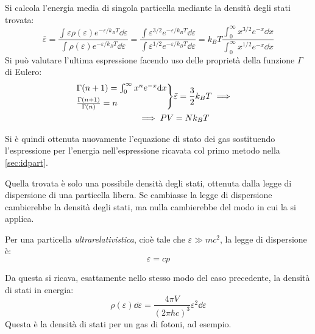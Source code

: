 \begin{es}
	Si calcola l'energia media di singola particella mediante la densità degli stati trovata:
	\begin{equation*}
	\bar{\varepsilon} = \frac{\int \varepsilon \rho(\varepsilon) e^{-\varepsilon/k_B T} \dd\varepsilon}{\int \rho(\varepsilon) e^{-\varepsilon/k_B T} \dd\varepsilon} = \frac{\int \varepsilon^{3/2} e^{-\varepsilon/k_B T} \dd\varepsilon}{\int \varepsilon^{1/2} e^{-\varepsilon/k_B T} \dd\varepsilon} = k_B T \frac{\int_0^\infty x^{3/2} e^{-x} \dd x}{\int_0^\infty x^{1/2} e^{-x} \dd x}
	\end{equation*}
	Si può valutare l'ultima espressione facendo uso delle proprietà della funzione $\Gamma$ di Eulero:
	\begin{align*}
	\begin{rcases*}
	\Gamma(n + 1) = \int_0^\infty x^n e^{-x} \dd x\\
	\frac{\Gamma(n + 1)}{\Gamma(n)} = n
	\end{rcases*}&
	\bar{\varepsilon} = \frac{3}{2} k_B T \implies\\
	\implies PV &= N k_B T
	\end{align*}
	
	Si è quindi ottenuta nuovamente l'equazione di stato dei gas sostituendo l'espressione per l'energia nell'espressione ricavata col primo metodo nella \cref{sec:idpart}.
\end{es}

Quella trovata è solo una possibile densità degli stati, ottenuta dalla legge di dispersione di una particella libera. Se cambiasse la legge di dispersione cambierebbe la densità degli stati, ma nulla cambierebbe del modo in cui la si applica.

\begin{es}
	\label{es:lindisp}
	Per una particella \textit{ultrarelativistica}, cioè tale che $\varepsilon \gg mc^2$, la legge di dispersione è:
	\begin{equation*}
		\varepsilon = cp
	\end{equation*}
	
	Da questa si ricava, esattamente nello stesso modo del caso precedente, la densità di stati in energia:
	\begin{equation*}
	\rho(\varepsilon) \dd \varepsilon = \frac{4\pi V}{(2\pi \hbar c)^3}\varepsilon^2\dd \varepsilon
	\end{equation*}
	\noindent Questa è la densità di stati per un gas di fotoni, ad esempio.
\end{es}

